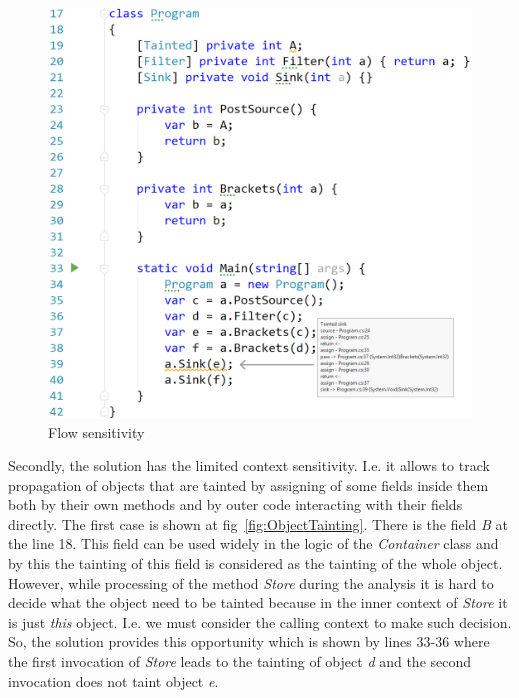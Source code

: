 \begin{figure}[h]
	\includegraphics[width=\linewidth]{screenshots/ReturnsAndBrackets.png}
	\caption{Flow sensitivity}
	\label{fig:ReturnsAndBrackets}
\end{figure}

Secondly, the solution has the limited context sensitivity. I.e. it allows to track propagation of objects that are tainted by assigning of some fields inside them both by their own methods and by outer code interacting with their fields directly.
The first case is shown at fig~\ref{fig:ObjectTainting}.
There is the field \textit{B} at the line 18. 
This field can be used widely in the logic of the \textit{Container} class and by this the tainting of this field is considered as the tainting of the whole object.
However, while processing of the method \textit{Store} during the analysis it is hard to decide what the object need to be tainted because in the inner context of \textit{Store} it is just \textit{this} object.
I.e. we must consider the calling context to make such decision.
So, the solution provides this opportunity which is shown by lines 33-36 where the first invocation of \textit{Store} leads to the tainting of object \textit{d} and the second invocation does not taint object \textit{e}.

